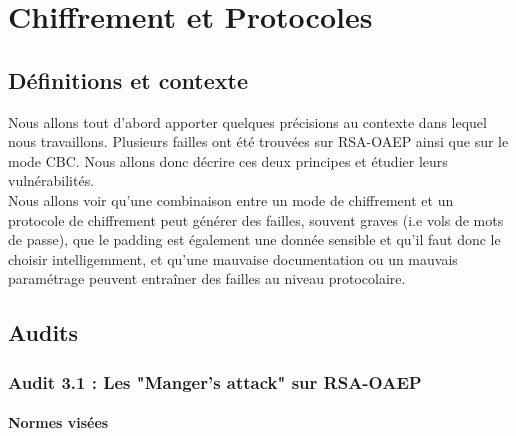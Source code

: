 \chapter{Chiffrement et Protocoles}

\section{Définitions et contexte}

Nous allons tout d'abord apporter quelques précisions au contexte dans lequel nous travaillons. Plusieurs failles ont été trouvées sur RSA-OAEP ainsi que sur le mode CBC. Nous allons donc décrire ces deux principes et étudier leurs vulnérabilités.\\

Nous allons voir qu'une combinaison entre un mode de chiffrement et un protocole de chiffrement peut générer des failles, souvent graves (i.e vols de mots de passe), que le padding est également une donnée sensible et qu'il faut donc le choisir intelligemment, et qu'une mauvaise documentation ou un mauvais paramétrage peuvent entraîner des failles au niveau protocolaire.

\section{Audits}
\subsection{Audit 3.1 : Les "Manger's attack" sur RSA-OAEP}
\subsubsection{Normes visées}

